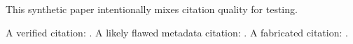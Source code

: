 \documentclass{article}
\begin{document}
This synthetic paper intentionally mixes citation quality for testing.

A verified citation: \cite{vaswani2017attention}.
A likely flawed metadata citation: \cite{bert_wrongvenue}.
A fabricated citation: \cite{quantum_unicorn_2025}.



\end{document}
